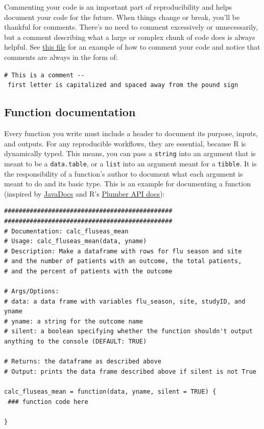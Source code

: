 \documentclass[]{book}
\begin{document}
Commenting your code is an important part of reproducibility and helps document your code for the future. When things change or break, you'll be thankful for comments. There's no need to comment excessively or unnecessarily, but a comment describing what a large or complex chunk of code does is always helpful. See \href{https://github.com/kmishra9/Flu-Absenteeism/blob/master/Master's\%20Thesis\%20-\%20Spatial\%20Epidemiology\%20of\%20Influenza/1b\%20-\%20Map-Management.R}{this file} for an example of how to comment your code and notice that comments are always in the form of:

\texttt{\#\ This\ is\ a\ comment\ -\/-\ first\ letter\ is\ capitalized\ and\ spaced\ away\ from\ the\ pound\ sign}

\hypertarget{function-documentation}{%
\subsection{Function documentation}\label{function-documentation}}

Every function you write must include a header to document its purpose, inputs, and outputs. For any reproducible workflows, they are essential, because R is dynamically typed. This means, you can pass a \texttt{string} into an argument that is meant to be a \texttt{data.table}, or a \texttt{list} into an argument meant for a \texttt{tibble}. It is the responsibility of a function's author to document what each argument is meant to do and its basic type. This is an example for documenting a function (inspired by \href{https://www.oracle.com/technetwork/java/javase/documentation/index-137868.html\#format}{JavaDocs} and R's \href{https://blog.rstudio.com/2018/10/23/rstudio-1-2-preview-plumber-integration/}{Plumber API docs}):

\begin{verbatim}
##############################################
##############################################
# Documentation: calc_fluseas_mean
# Usage: calc_fluseas_mean(data, yname)
# Description: Make a dataframe with rows for flu season and site
# and the number of patients with an outcome, the total patients,
# and the percent of patients with the outcome

# Args/Options:
# data: a data frame with variables flu_season, site, studyID, and yname
# yname: a string for the outcome name
# silent: a boolean specifying whether the function shouldn't output anything to the console (DEFAULT: TRUE)

# Returns: the dataframe as described above
# Output: prints the data frame described above if silent is not True

calc_fluseas_mean = function(data, yname, silent = TRUE) {
 ### function code here 

}
\end{verbatim}
\end{document}
